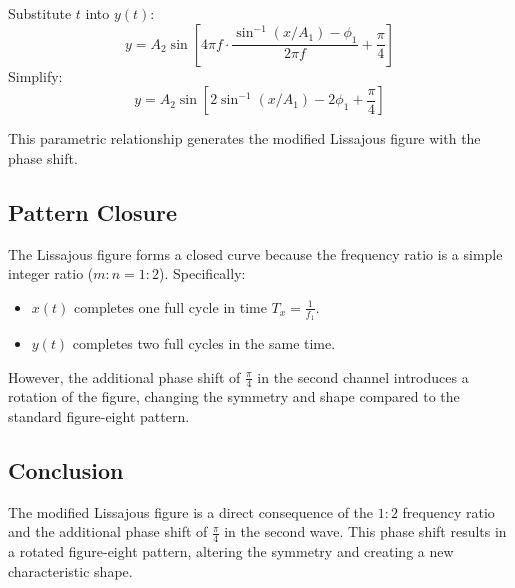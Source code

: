 \documentclass[12pt,a4paper]{report}
\begin{document}
Substitute $t$ into $y(t)$:
\[
y = A_2 \sin\left[4 \pi f \cdot \frac{\sin^{-1}(x / A_1) - \phi_1}{2 \pi f} + \frac{\pi}{4}\right]
\]
Simplify:
\[
y = A_2 \sin\left[2 \sin^{-1}(x / A_1) - 2 \phi_1 + \frac{\pi}{4}\right]
\]

This parametric relationship generates the modified Lissajous figure with the phase shift.

\subsection*{Pattern Closure}
The Lissajous figure forms a closed curve because the frequency ratio is a simple integer ratio ($m : n = 1 : 2$). Specifically:
\begin{itemize}
    \item $x(t)$ completes one full cycle in time $T_x = \frac{1}{f_1}$.
    \item $y(t)$ completes two full cycles in the same time.
\end{itemize}
However, the additional phase shift of \( \frac{\pi}{4} \) in the second channel introduces a rotation of the figure, changing the symmetry and shape compared to the standard figure-eight pattern.

\subsection*{Conclusion}
The modified Lissajous figure is a direct consequence of the $1 : 2$ frequency ratio and the additional phase shift of \( \frac{\pi}{4} \) in the second wave. This phase shift results in a rotated figure-eight pattern, altering the symmetry and creating a new characteristic shape.
\end{document}
